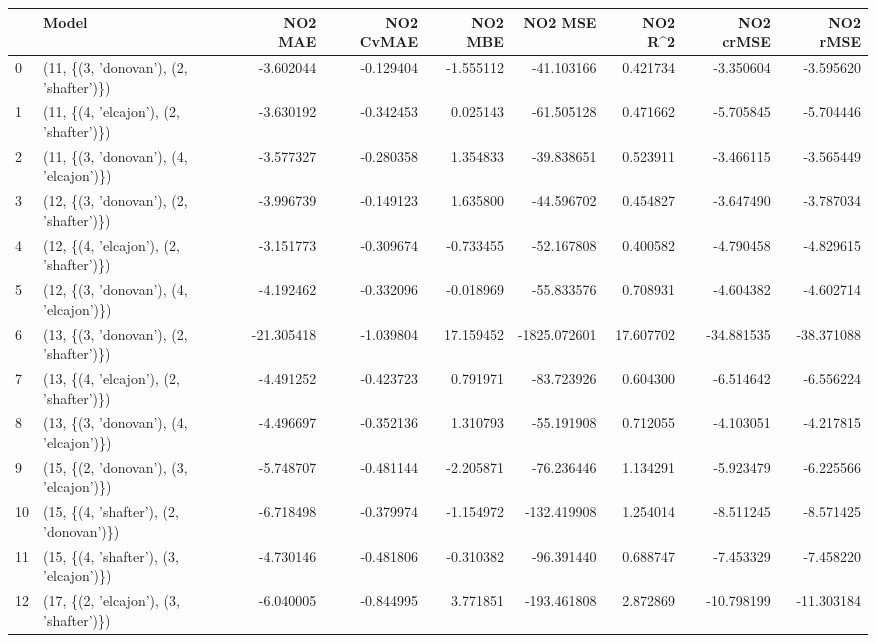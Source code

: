 \begin{tabular}{llrrrrrrr}
\toprule
{} &                                   Model &    NO2 MAE &  NO2 CvMAE &    NO2 MBE &      NO2 MSE &    NO2 R\textasciicircum2 &  NO2 crMSE &   NO2 rMSE \\
\midrule
0  &  (11, \{(3, 'donovan'), (2, 'shafter')\}) &  -3.602044 &  -0.129404 &  -1.555112 &   -41.103166 &   0.421734 &  -3.350604 &  -3.595620 \\
1  &  (11, \{(4, 'elcajon'), (2, 'shafter')\}) &  -3.630192 &  -0.342453 &   0.025143 &   -61.505128 &   0.471662 &  -5.705845 &  -5.704446 \\
2  &  (11, \{(3, 'donovan'), (4, 'elcajon')\}) &  -3.577327 &  -0.280358 &   1.354833 &   -39.838651 &   0.523911 &  -3.466115 &  -3.565449 \\
3  &  (12, \{(3, 'donovan'), (2, 'shafter')\}) &  -3.996739 &  -0.149123 &   1.635800 &   -44.596702 &   0.454827 &  -3.647490 &  -3.787034 \\
4  &  (12, \{(4, 'elcajon'), (2, 'shafter')\}) &  -3.151773 &  -0.309674 &  -0.733455 &   -52.167808 &   0.400582 &  -4.790458 &  -4.829615 \\
5  &  (12, \{(3, 'donovan'), (4, 'elcajon')\}) &  -4.192462 &  -0.332096 &  -0.018969 &   -55.833576 &   0.708931 &  -4.604382 &  -4.602714 \\
6  &  (13, \{(3, 'donovan'), (2, 'shafter')\}) & -21.305418 &  -1.039804 &  17.159452 & -1825.072601 &  17.607702 & -34.881535 & -38.371088 \\
7  &  (13, \{(4, 'elcajon'), (2, 'shafter')\}) &  -4.491252 &  -0.423723 &   0.791971 &   -83.723926 &   0.604300 &  -6.514642 &  -6.556224 \\
8  &  (13, \{(3, 'donovan'), (4, 'elcajon')\}) &  -4.496697 &  -0.352136 &   1.310793 &   -55.191908 &   0.712055 &  -4.103051 &  -4.217815 \\
9  &  (15, \{(2, 'donovan'), (3, 'elcajon')\}) &  -5.748707 &  -0.481144 &  -2.205871 &   -76.236446 &   1.134291 &  -5.923479 &  -6.225566 \\
10 &  (15, \{(4, 'shafter'), (2, 'donovan')\}) &  -6.718498 &  -0.379974 &  -1.154972 &  -132.419908 &   1.254014 &  -8.511245 &  -8.571425 \\
11 &  (15, \{(4, 'shafter'), (3, 'elcajon')\}) &  -4.730146 &  -0.481806 &  -0.310382 &   -96.391440 &   0.688747 &  -7.453329 &  -7.458220 \\
12 &  (17, \{(2, 'elcajon'), (3, 'shafter')\}) &  -6.040005 &  -0.844995 &   3.771851 &  -193.461808 &   2.872869 & -10.798199 & -11.303184 \\

\end{tabular}

